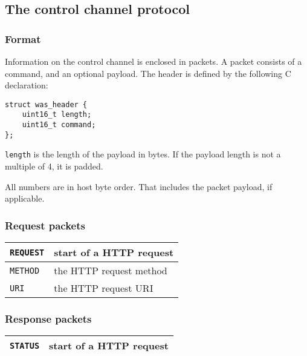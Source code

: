 \documentclass[a4paper,12pt]{article}
\begin{document}
\subsection{The control channel protocol}

\subsubsection{Format}

Information on the control channel is enclosed in packets.  A packet
consists of a command, and an optional payload.  The header is defined
by the following C declaration:

\begin{verbatim}
struct was_header {
    uint16_t length;
    uint16_t command;
};
\end{verbatim}

\texttt{length} is the length of the payload in bytes.  If the payload
length is not a multiple of 4, it is padded.

All numbers are in host byte order.  That includes the packet payload,
if applicable.

\subsubsection{Request packets}

\begin{longtable}{|l|p{10cm}|}
\hline

\texttt{REQUEST} & start of a HTTP request \\

\hline

\texttt{METHOD} & the HTTP request method \\

\hline

\texttt{URI} & the HTTP request URI \\

\hline
\end{longtable}

\subsubsection{Response packets}

\begin{longtable}{|l|p{10cm}|}
\hline

\texttt{STATUS} & start of a HTTP request \\

\hline
\end{longtable}
\end{document}
